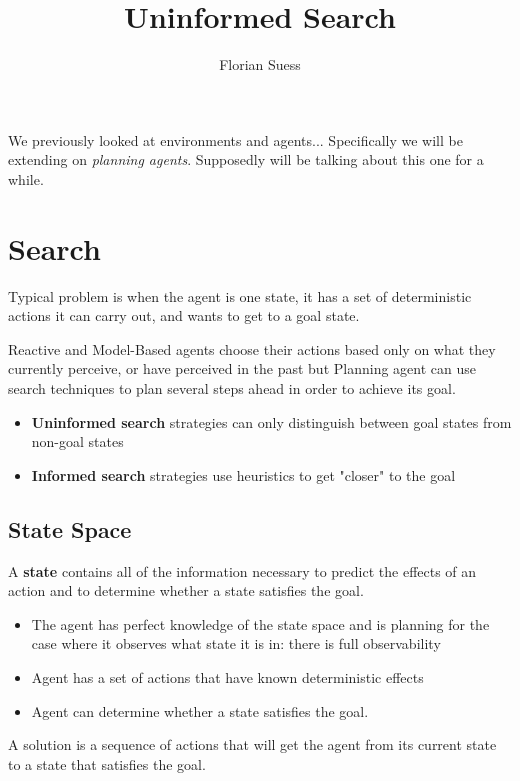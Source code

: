 \documentclass{article}
\begin{document}
\title{Uninformed Search}
\date{}
\author{Florian Suess}
\maketitle
We previously looked at environments and agents... Specifically we will be extending on \emph{planning agents}. Supposedly will be talking about this one for a while.

\section{Search}
Typical problem is when the agent is one state, it has a set of deterministic actions it can carry out, and wants to get to a goal state.

Reactive and Model-Based agents choose their actions based only on what they currently perceive, or have perceived in the past but Planning agent can use search techniques to plan several steps ahead in order to achieve its goal.

\begin{itemize}
	\item \textbf{Uninformed search} strategies can only distinguish between goal states from non-goal states
	\item \textbf{Informed search} strategies use heuristics to get "closer" to the goal
\end{itemize}

\subsection{State Space}
A \textbf{state} contains all of the information necessary to predict the effects of an action and to determine whether a state satisfies the goal.

\begin{itemize}
	\item The agent has perfect knowledge of the state space and is planning for the case where it observes what state it is in: there is full observability
	\item Agent has a set of actions that have known deterministic effects
	\item Agent can determine whether a state satisfies the goal.
\end{itemize}

A solution is a sequence of actions that will get the agent from its current state to a state that satisfies the goal.
\end{document}
